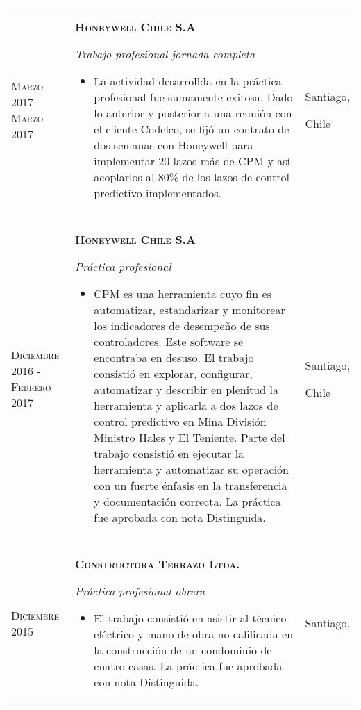 \documentclass[a4paper,10pt]{article}
\begin{document}
\begin{tabular}{p{2 cm}|p{11cm}|p{2cm}}

\textsc{Marzo} 2017 - \textsc{Marzo} 2017 &
\textbf{\textsc{Honeywell Chile S.A}}

\textit{Trabajo profesional jornada completa}

\begin{itemize}
	\item La actividad desarrollda en la práctica profesional fue sumamente exitosa. Dado lo anterior y posterior a una reunión con el cliente Codelco, se fijó un contrato de dos semanas con Honeywell para implementar 20 lazos más de CPM y así acoplarlos al 80\% de los lazos de control predictivo implementados.
\end{itemize}
&
Santiago, 

Chile
\\

&\\

\textsc{Diciembre} 2016 - \textsc{Febrero} 2017 &
\textbf{\textsc{Honeywell Chile S.A}}

\textit{Práctica profesional}

\begin{itemize}
	\item CPM es una herramienta cuyo fin es automatizar, estandarizar y monitorear los indicadores de desempeño de sus controladores. Este software se encontraba en desuso. El trabajo consistió en explorar, configurar, automatizar y describir en plenitud la herramienta y aplicarla a dos lazos de control predictivo en Mina División Ministro Hales y El Teniente. Parte del trabajo consistió en ejecutar la herramienta y automatizar su operación con un fuerte énfasis en la transferencia y documentación correcta. La práctica fue aprobada con nota Distinguida.
\end{itemize}
&
Santiago, 

Chile
\\

&\\



	

\textsc{Diciembre} 2015 &
\textbf{\textsc{Constructora Terrazo Ltda.}}

\textit{Práctica profesional obrera}

\begin{itemize}
	\item El trabajo consistió en asistir al técnico eléctrico y mano de obra no calificada en la construcción de un condominio de cuatro casas. La práctica fue aprobada con nota Distinguida.
\end{itemize}
&
Santiago, 


\end{tabular}
\end{document}
